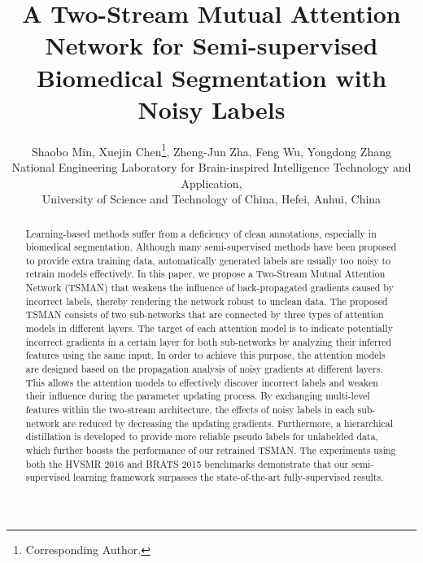 \documentclass[letterpaper]{article} %
\begin{document}
\title{A Two-Stream Mutual Attention Network for Semi-supervised Biomedical Segmentation with Noisy Labels}
\author{Shaobo Min, Xuejin Chen\thanks{Corresponding Author.}, Zheng-Jun Zha, Feng Wu, Yongdong Zhang\\
National Engineering Laboratory for Brain-inspired Intelligence Technology and Application,\\
University of Science and Technology of China, Hefei, Anhui, China\\ %
}
\maketitle
\begin{abstract}
Learning-based methods suffer from a deficiency of clean annotations, especially in biomedical segmentation.
Although many semi-supervised methods have been proposed to provide extra training data, automatically generated labels are usually too noisy to retrain models effectively.
In this paper, we propose a Two-Stream Mutual Attention Network (TSMAN) that weakens the influence of back-propagated gradients caused by incorrect labels, thereby rendering the network robust to unclean data.
The proposed TSMAN consists of two sub-networks that are connected by three types of attention models in different layers.
The target of each attention model is to indicate potentially incorrect gradients in a certain layer for both sub-networks by analyzing their inferred features using the same input.
In order to achieve this purpose, the attention models are designed based on the propagation analysis of noisy gradients at different layers. This allows the attention models to effectively discover incorrect labels and weaken their influence during the parameter updating process.
By exchanging multi-level features within the two-stream architecture, the effects of noisy labels in each sub-network are reduced by decreasing the updating gradients.
Furthermore, a hierarchical distillation is developed to provide more reliable pseudo labels for unlabelded data, which further boosts the performance of our retrained TSMAN.
The experiments using both the HVSMR 2016 and BRATS 2015 benchmarks demonstrate that our semi-supervised learning framework surpasses the state-of-the-art fully-supervised results. 
\end{abstract}
\end{document}
